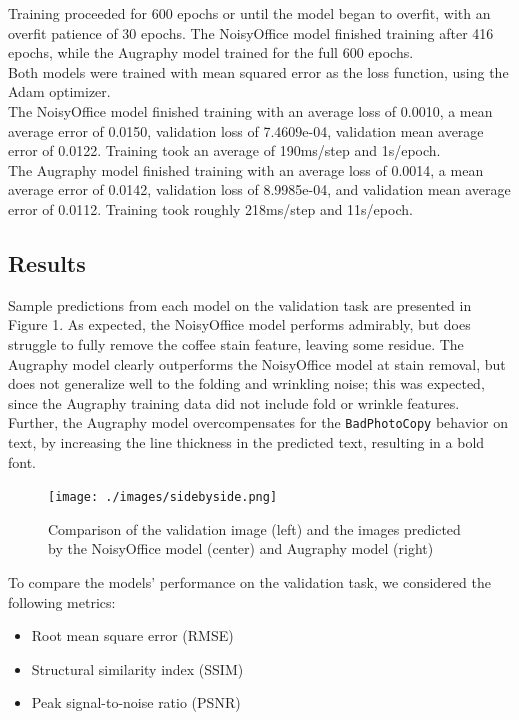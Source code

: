 \documentclass[runningheads]{article}
\begin{document}
Training proceeded for 600 epochs or until the model began to overfit, with an overfit patience of 30 epochs. The NoisyOffice model finished training after 416 epochs, while the Augraphy model trained for the full 600 epochs.\\

Both models were trained with mean squared error as the loss function, using the Adam optimizer.\\

The NoisyOffice model finished training with an average loss of 0.0010, a mean average error of 0.0150, validation loss of 7.4609e-04, validation mean average error of 0.0122. Training took an average of 190ms/step and 1s/epoch.\\

The Augraphy model finished training with an average loss of 0.0014, a mean average error of 0.0142, validation loss of 8.9985e-04, and validation mean average error of 0.0112. Training took roughly 218ms/step and 11s/epoch.

\subsection{Results}
\label{sec:org9fa72d2}
Sample predictions from each model on the validation task are presented in Figure 1. As expected, the NoisyOffice model performs admirably, but does struggle to fully remove the coffee stain feature, leaving some residue. The Augraphy model clearly outperforms the NoisyOffice model at stain removal, but does not generalize well to the folding and wrinkling noise; this was expected, since the Augraphy training data did not include fold or wrinkle features. Further, the Augraphy model overcompensates for the \texttt{BadPhotoCopy} behavior on text, by increasing the line thickness in the predicted text, resulting in a bold font.\\

\begin{figure}[htbp]
\centering
\texttt{[image: ./images/sidebyside.png]}
\caption{\label{fig:org74839c0}Comparison of the validation image (left) and the images predicted by the NoisyOffice model (center) and Augraphy model (right)}
\end{figure}

To compare the models' performance on the validation task, we considered the following metrics:
\begin{itemize}
\item Root mean square error (RMSE)
\item Structural similarity index (SSIM)
\item Peak signal-to-noise ratio (PSNR)
\end{itemize}
\end{document}
